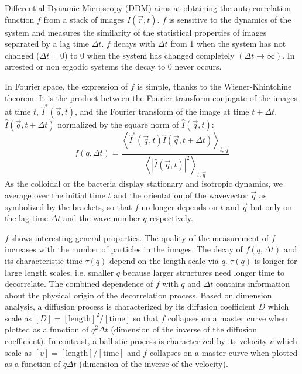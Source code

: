 \documentclass[prb,twocolumn,amsmath,amssymb]{revtex4-1}
\newcommand{\tgn}[1]{{\color{blue}#1}} %
\begin{document}
\tgn{Differential Dynamic Microscopy (DDM) aims at obtaining the auto-correlation function $f$\cite{ajp1995passmore} from a stack of images $I(\vec{r}, t)$. $f$ is sensitive to the dynamics of the system and measures the similarity of the statistical properties of images separated by a lag time $\Delta t$. 
$f$ decays with $\Delta t$ from 1 when the system has not changed ($\Delta t=0$) to 0 when the system has changed completely $(\Delta t\rightarrow\infty)$. In arrested or non ergodic systems the decay to 0 never occurs.

In Fourier space, the expression of $f$ is simple,  thanks to the Wiener-Khintchine theorem. It is the product between the Fourier transform conjugate of the images at time $t$,  $\hat{I}^*(\vec{q}, t)$, and the Fourier transform of the image at time $t+\Delta t$, $\hat{I}(\vec{q}, t+\Delta t)$ normalized by the square norm of $\hat{I}(\vec{q}, t)$:
\begin{equation}
f(q, \Delta t) =\frac{\left\langle \hat{I}^*(\vec{q}, t) \hat{I}(\vec{q}, t+\Delta t) \right\rangle_{t, \vec{q}}}{\left\langle | \widehat{I}(\vec{q},t)|^2  \right\rangle_{t, \vec{q}} }
\label{eq:f}
\end{equation}
As the colloidal or the bacteria display stationary and  isotropic dynamics, we average over the initial time $t$ and the orientation of the wavevector $\vec{q}$ as symbolized by the brackets, so that $f$ no longer depends on $t$ and $\vec{q}$  but only on the lag time $\Delta t$ and the wave number $q$ respectively. 

$f$ shows interesting general properties. The quality of the measurement of $f$ increases with the number of particles in the images. The decay of $f(q, \Delta t)$ and its characteristic time $\tau(q)$ depend on the length scale via $q$. $\tau(q)$ is longer for large length scales, i.e. smaller $q$ because larger structures need longer time to decorrelate. The combined dependence of $f$ with $q$ and $\Delta t$ contains information about the physical origin of the decorrelation process. Based on dimension analysis, a diffusion process is characterized by its diffusion coefficient $D$ which scale as $[D]=[\text{length}]^2/[\text{time}]$ so that $f$ collapses on a master curve when plotted as a function of $q^2\Delta t$ (dimension of the inverse of the diffusion coefficient). In contrast, a ballistic process is characterized by its velocity $v$ which scale as $[v]=[\text{length}]/[\text{time}]$ and  $f$ collapses on a master curve when plotted as a function of $q\Delta t$ (dimension of the inverse of the velocity).

}
\end{document}
